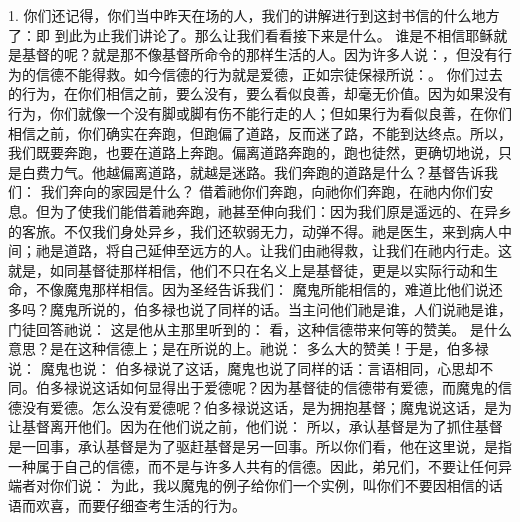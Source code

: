 1. 你们还记得，你们当中昨天在场的人，我们的讲解进行到这封书信的什么地方了：即  到此为止我们讲论了。那么让我们看看接下来是什么。  谁是不相信耶稣就是基督的呢？就是那不像基督所命令的那样生活的人。因为许多人说：，但没有行为的信德不能得救。如今信德的行为就是爱德，正如宗徒保禄所说：。 你们过去的行为，在你们相信之前，要么没有，要么看似良善，却毫无价值。因为如果没有行为，你们就像一个没有脚或脚有伤不能行走的人；但如果行为看似良善，在你们相信之前，你们确实在奔跑，但跑偏了道路，反而迷了路，不能到达终点。所以，我们既要奔跑，也要在道路上奔跑。偏离道路奔跑的，跑也徒然，更确切地说，只是白费力气。他越偏离道路，就越是迷路。我们奔跑的道路是什么？基督告诉我们：  我们奔向的家园是什么？ 借着祂你们奔跑，向祂你们奔跑，在祂内你们安息。但为了使我们能借着祂奔跑，祂甚至伸向我们：因为我们原是遥远的、在异乡的客旅。不仅我们身处异乡，我们还软弱无力，动弹不得。祂是医生，来到病人中间；祂是道路，将自己延伸至远方的人。让我们由祂得救，让我们在祂内行走。这就是，如同基督徒那样相信，他们不只在名义上是基督徒，更是以实际行动和生命，不像魔鬼那样相信。因为圣经告诉我们：  魔鬼所能相信的，难道比他们说还多吗？魔鬼所说的，伯多禄也说了同样的话。当主问他们祂是谁，人们说祂是谁，门徒回答祂说：  这是他从主那里听到的： 看，这种信德带来何等的赞美。 是什么意思？是在这种信德上；是在所说的上。祂说： 多么大的赞美！于是，伯多禄说： 魔鬼也说： 伯多禄说了这话，魔鬼也说了同样的话：言语相同，心思却不同。伯多禄说这话如何显得出于爱德呢？因为基督徒的信德带有爱德，而魔鬼的信德没有爱德。怎么没有爱德呢？伯多禄说这话，是为拥抱基督；魔鬼说这话，是为让基督离开他们。因为在他们说之前，他们说： 所以，承认基督是为了抓住基督是一回事，承认基督是为了驱赶基督是另一回事。所以你们看，他在这里说，是指一种属于自己的信德，而不是与许多人共有的信德。因此，弟兄们，不要让任何异端者对你们说： 为此，我以魔鬼的例子给你们一个实例，叫你们不要因相信的话语而欢喜，而要仔细查考生活的行为。\par

